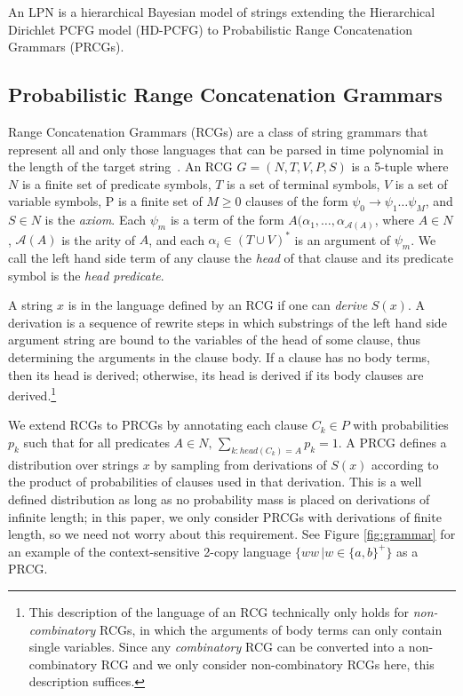 \documentclass{article} %
\begin{document}
An LPN is a hierarchical Bayesian model of strings
extending the Hierarchical Dirichlet PCFG model (HD-PCFG) to
Probabilistic Range Concatenation Grammars (PRCGs). 

\subsection{Probabilistic Range Concatenation Grammars}
Range Concatenation Grammars (RCGs) are a class of string grammars
that represent all and only those languages that can be parsed in time
polynomial in the length of the target
string~\cite{boullier2005range}. An RCG $G=(N, T, V, P, S)$ is a
5-tuple where $N$ is a finite set of predicate symbols, $T$ is a set
of terminal symbols, $V$ is a set of variable symbols, P is a finite
set of $M \geq 0$ clauses of the form $\psi_0 \rightarrow \psi_1 \dots
\psi_M$, and $S \in N$ is the \emph{axiom}. Each $\psi_m$ is a term of
the form $A(\alpha_1, \dots, \alpha_{\mathcal{A}(A)}$, where $A \in
N$, $\mathcal{A}(A)$ is the arity of $A$, and each $\alpha_i \in (T
\cup V)^*$ is an argument of $\psi_m$. We call the left hand side term
of any clause the \emph{head} of that clause and its predicate symbol
is the \emph{head predicate}.

A string $x$ is in the language defined by an RCG if one can
\emph{derive} $S(x)$. A derivation is a sequence of rewrite steps in
which substrings of the left hand side argument string are bound to
the variables of the head of some clause, thus determining the
arguments in the clause body. If a clause has no body terms, then its
head is derived; otherwise, its head is derived if its body clauses
are derived.\footnote{This description of the language of an RCG
  technically only holds for \emph{non-combinatory} RCGs, in which the
  arguments of body terms can only contain single variables. Since any
  \emph{combinatory} RCG can be converted into a non-combinatory RCG
  and we only consider non-combinatory RCGs here, this description
  suffices.}

We extend RCGs to PRCGs by annotating each clause $C_k \in P$ with
probabilities $p_k$ such that for all predicates ${A \in N, \,
  \sum_{k:head(C_k)=A} p_k = 1}$. A PRCG defines a distribution over
strings $x$ by sampling from derivations of $S(x)$ according to the
product of probabilities of clauses used in that derivation. This is a
well defined distribution as long as no probability mass is placed on
derivations of infinite length; in this paper, we only consider PRCGs
with derivations of finite length, so we need not worry about this
requirement. See Figure \ref{fig:grammar} for an example of the
context-sensitive 2-copy language $\{ww\,|w \in \{a,b\}^+\}$ as a
PRCG.
\end{document}
